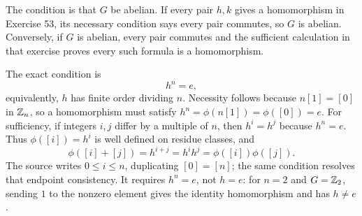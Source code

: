 The condition is that $G$ be abelian. If every pair $h,k$ gives a homomorphism in Exercise 53, its necessary condition says every pair commutes, so $G$ is abelian. Conversely, if $G$ is abelian, every pair commutes and the sufficient calculation in that exercise proves every such formula is a homomorphism.

The exact condition is
\[\boxed{h^n=e,}\]
equivalently, $h$ has finite order dividing $n$. Necessity follows because $n[1]=[0]$ in $\mathbb{Z}_n$, so a homomorphism must satisfy $h^n=\phi(n[1])=\phi([0])=e$. For sufficiency, if integers $i,j$ differ by a multiple of $n$, then $h^i=h^j$ because $h^n=e$. Thus $\phi([i])=h^i$ is well defined on residue classes, and
\[\phi([i]+[j])=h^{i+j}=h^ih^j=\phi([i])\phi([j]).\]
The source writes $0\le i\le n$, duplicating $[0]=[n]$; the same condition resolves that endpoint consistency. It requires $h^n=e$, not $h=e$: for $n=2$ and $G=\mathbb{Z}_2$, sending $1$ to the nonzero element gives the identity homomorphism and has $h\ne e$.
